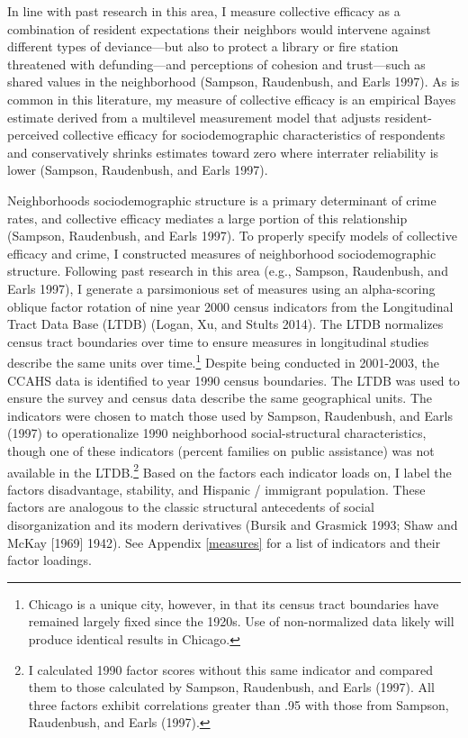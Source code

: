 \documentclass [11pt, proquest] {uwthesis}[2015/03/03]
\begin{document}
In line with past research in this area, I measure collective efficacy as a combination of resident expectations their neighbors would intervene against different types of deviance---but also to protect a library or fire station threatened with defunding---and perceptions of cohesion and trust---such as shared values in the neighborhood (Sampson, Raudenbush, and Earls 1997). As is common in this literature, my measure of collective efficacy is an empirical Bayes estimate derived from a multilevel measurement model that adjusts resident-perceived collective efficacy for sociodemographic characteristics of respondents and conservatively shrinks estimates toward zero where interrater reliability is lower (Sampson, Raudenbush, and Earls 1997).

Neighborhoods sociodemographic structure is a primary determinant of crime rates, and collective efficacy mediates a large portion of this relationship (Sampson, Raudenbush, and Earls 1997). To properly specify models of collective efficacy and crime, I constructed measures of neighborhood sociodemographic structure. Following past research in this area (e.g., Sampson, Raudenbush, and Earls 1997), I generate a parsimonious set of measures using an alpha-scoring oblique factor rotation of nine year 2000 census indicators from the Longitudinal Tract Data Base (LTDB) (Logan, Xu, and Stults 2014). The LTDB normalizes census tract boundaries over time to ensure measures in longitudinal studies describe the same units over time.\footnote{Chicago is a unique city, however, in that its census tract boundaries have remained largely fixed since the 1920s. Use of non-normalized data likely will produce identical results in Chicago.} Despite being conducted in 2001-2003, the CCAHS data is identified to year 1990 census boundaries. The LTDB was used to ensure the survey and census data describe the same geographical units. The indicators were chosen to match those used by Sampson, Raudenbush, and Earls (1997) to operationalize 1990 neighborhood social-structural characteristics, though one of these indicators (percent families on public assistance) was not available in the LTDB.\footnote{I calculated 1990 factor scores without this same indicator and compared them to those calculated by Sampson, Raudenbush, and Earls (1997). All three factors exhibit correlations greater than .95 with those from Sampson, Raudenbush, and Earls (1997).} Based on the factors each indicator loads on, I label the factors disadvantage, stability, and Hispanic / immigrant population. These factors are analogous to the classic structural antecedents of social disorganization and its modern derivatives (Bursik and Grasmick 1993; Shaw and McKay {[}1969{]} 1942). See Appendix \ref{measures} for a list of indicators and their factor loadings.
\end{document}
